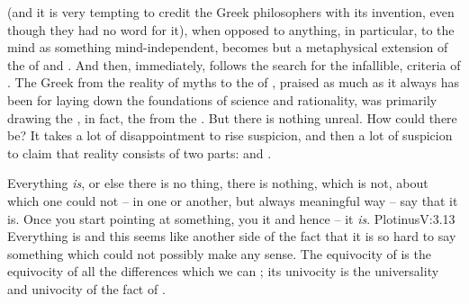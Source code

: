 

 (and it is very tempting to credit the Greek philosophers with its
invention, even though they had no word for it), when opposed to anything, in
particular, to the mind as something mind-independent,
becomes but a metaphysical extension of the   of
 and .
And then, immediately, follows the search for the infallible, 
criteria of .  The Greek  from the reality of myths to
the  of , praised as much as it always has
been for laying down the foundations of science and rationality, was primarily
drawing the , in fact,  the  from the
.  But there is nothing unreal. How could there be? It takes a lot
of disappointment to rise suspicion, and then a lot of suspicion to claim that
reality consists of two parts:  and .

Everything {\em is}, or else there is no thing, there is nothing,
which is not, about which one could not -- in one or another, but always
meaningful way -- say that it is.  Once you start pointing at something, you
 it and hence -- it {\em is}.  \citet{Being itself is manifold
  within itself, and whatever else you may name has Being.}{Plotinus}{V:3.13}
Everything is and this seems like another side of the fact that it is so hard to
say something which could not possibly make any sense.  The equivocity of  is the equivocity of all the differences which we can ;
its univocity is the universality and univocity of the fact of .


